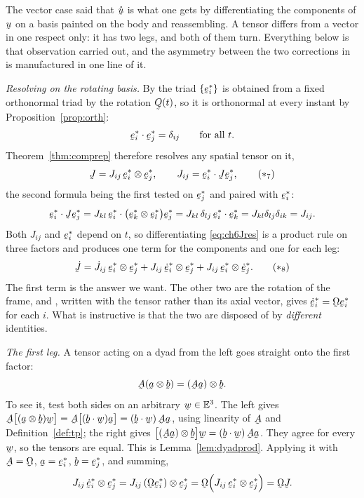 \begin{solution}
The vector case  said that $\mathring\bu$ is what one gets by
differentiating the components of $\bu$ on a basis painted on the body
and reassembling. A tensor differs from a vector in one respect only:
it has two legs, and both of them turn. Everything below is that
observation carried out, and the asymmetry between the two corrections
in  is manufactured in one line of it.

\medskip
\noindent\emph{Resolving on the rotating basis.}
By  the triad $\{\be^{*}_{i}\}$ is obtained from a fixed
orthonormal triad by the rotation $\bQ(t)$, so it is orthonormal at
every instant by Proposition~\ref{prop:orth}:
\[
   \ip{\be^{*}_{i}}{\be^{*}_{j}}=\dd_{ij}
   \qquad\text{for all }t .
\]
Theorem~\ref{thm:comprep} therefore resolves any spatial tensor on it,
\begin{equation}
   \vek{J}=J_{ij}\,\be^{*}_{i}\otimes\be^{*}_{j},
   \qquad J_{ij}=\ip{\be^{*}_{i}}{\vek{J}\be^{*}_{j}} ,
   \tag{$\ast_{7}$}\label{eq:ch6Jres}
\end{equation}
the second formula being the first tested on $\be^{*}_{j}$ and paired
with $\be^{*}_{i}$:
\[
   \ip{\be^{*}_{i}}{\vek{J}\be^{*}_{j}}
   =J_{kl}\,\ip{\be^{*}_{i}}{\big(\be^{*}_{k}\otimes\be^{*}_{l}\big)
     \be^{*}_{j}}
   =J_{kl}\,\dd_{lj}\,\ip{\be^{*}_{i}}{\be^{*}_{k}}
   =J_{kl}\dd_{lj}\dd_{ik}=J_{ij} .
\]
Both $J_{ij}$ and $\be^{*}_{i}$ depend on $t$, so differentiating
\eqref{eq:ch6Jres} is a product rule on three factors and produces one
term for the components and one for each leg:
\begin{equation}
   \dot{\vek{J}}=\dot J_{ij}\,\be^{*}_{i}\otimes\be^{*}_{j}
   +J_{ij}\,\dot{\be}^{*}_{i}\otimes\be^{*}_{j}
   +J_{ij}\,\be^{*}_{i}\otimes\dot{\be}^{*}_{j} .
   \tag{$\ast_{8}$}\label{eq:ch6Jdot}
\end{equation}
The first term is the answer we want. The other two are the rotation of
the frame, and , written with the tensor rather than its
axial vector, gives $\dot{\be}^{*}_{i}=\bOm\be^{*}_{i}$ for each $i$.
What is instructive is that the two are disposed of by
\emph{different} identities.

\medskip
\noindent\emph{The first leg.}
A tensor acting on a dyad from the left goes straight onto the first
factor:
\[
   \bA(\ba\otimes\bb)=(\bA\ba)\otimes\bb .
\]
To see it, test both sides on an arbitrary $\bw\in\Vt$. The left gives
$\bA\big[(\ba\otimes\bb)\bw\big]=\bA\big[(\ip\bb\bw)\ba\big]
=(\ip\bb\bw)\,\bA\ba$, using linearity of $\bA$ and
Definition~\ref{def:tp}; the right gives
$\big[(\bA\ba)\otimes\bb\big]\bw=(\ip\bb\bw)\,\bA\ba$. They agree for
every $\bw$, so the tensors are equal. This is
Lemma~\ref{lem:dyadprod}. Applying it with $\bA=\bOm$,
$\ba=\be^{*}_{i}$, $\bb=\be^{*}_{j}$, and summing,
\[
   J_{ij}\,\dot{\be}^{*}_{i}\otimes\be^{*}_{j}
   =J_{ij}\,(\bOm\be^{*}_{i})\otimes\be^{*}_{j}
   =\bOm\Big(J_{ij}\,\be^{*}_{i}\otimes\be^{*}_{j}\Big)
   =\bOm\vek{J} .
\]


\end{solution}
